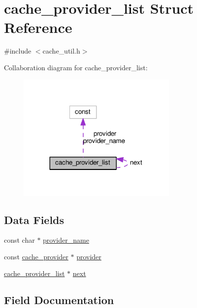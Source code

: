 \hypertarget{structcache__provider__list}{}\section{cache\+\_\+provider\+\_\+list Struct Reference}
\label{structcache__provider__list}


{\ttfamily \#include $<$cache\+\_\+util.\+h$>$}



Collaboration diagram for cache\+\_\+provider\+\_\+list\+:
\nopagebreak
\begin{figure}[H]
\begin{center}
\leavevmode
\includegraphics[width=221pt]{structcache__provider__list__coll__graph}
\end{center}
\end{figure}
\subsection*{Data Fields}
\begin{DoxyCompactItemize}
\item 
const char $\ast$ \hyperlink{structcache__provider__list_a0bd2adbaa02f1aa6af1971fd24b09b6a}{provider\+\_\+name}
\item 
const \hyperlink{structcache__provider}{cache\+\_\+provider} $\ast$ \hyperlink{structcache__provider__list_a1e1caa5b70698f255962728326dc1be3}{provider}
\item 
\hyperlink{structcache__provider__list}{cache\+\_\+provider\+\_\+list} $\ast$ \hyperlink{structcache__provider__list_a87c07afc8bb63fe7fd2e9274e60341a9}{next}
\end{DoxyCompactItemize}


\subsection{Field Documentation}
